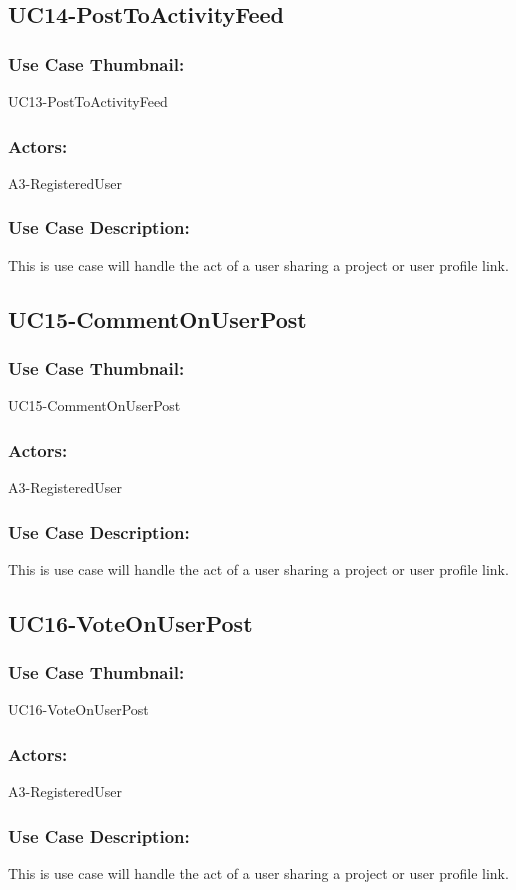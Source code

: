 \documentclass[11pt, openany]{report}
\begin{document}
\subsection{UC14-PostToActivityFeed}
\label{sUC14}
\subsubsection*{Use Case Thumbnail:}
UC13-PostToActivityFeed
\subsubsection*{Actors:}
A3-RegisteredUser
\subsubsection*{Use Case Description:}
This is use case will handle the act of a user sharing a project or user profile link.


\subsection{UC15-CommentOnUserPost}
\label{sUC15}
\subsubsection*{Use Case Thumbnail:}
UC15-CommentOnUserPost
\subsubsection*{Actors:}
A3-RegisteredUser
\subsubsection*{Use Case Description:}
This is use case will handle the act of a user sharing a project or user profile link.


\subsection{UC16-VoteOnUserPost}
\label{sUC16}
\subsubsection*{Use Case Thumbnail:}
UC16-VoteOnUserPost
\subsubsection*{Actors:}
A3-RegisteredUser
\subsubsection*{Use Case Description:}
This is use case will handle the act of a user sharing a project or user profile link.
\end{document}
